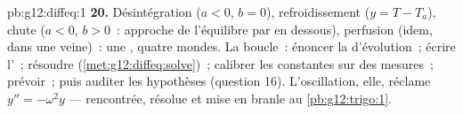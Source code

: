 \begin{solution}{pb:g12:diffeq:1}
\textbf{20.} Désintégration ($a < 0$, $b = 0$), refroidissement
($y = T - T_a$), chute ($a < 0$, $b > 0$~: approche de l'équilibre
par en dessous), perfusion (idem, dans une veine)~: une ,
quatre mondes. La boucle~: énoncer la  d'évolution~; écrire
l'~; résoudre (\cref{met:g12:diffeq:solve})~; calibrer les
constantes sur des mesures~; prévoir~; puis auditer les hypothèses
(question 16). L'oscillation, elle, réclame $y'' = -\omega^2 y$ ---
rencontrée, résolue et mise en branle au \cref{pb:g12:trigo:1}.
\end{solution}
